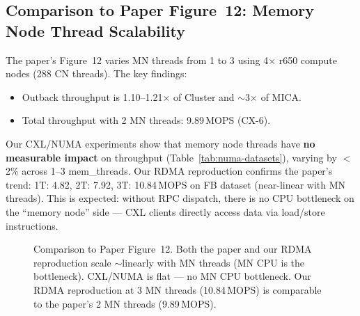\documentclass[11pt,a4paper]{article}
\begin{document}
\subsection{Comparison to Paper Figure~12: Memory Node Thread Scalability}

The paper's Figure~12 varies MN threads from 1 to 3 using 4$\times$ r650 compute nodes (288 CN threads). The key findings:
\begin{itemize}[nosep]
  \item Outback throughput is 1.10--1.21$\times$ of Cluster and $\sim$3$\times$ of MICA.
  \item Total throughput with 2 MN threads: 9.89\,MOPS (CX-6).
\end{itemize}

Our CXL/NUMA experiments show that memory node threads have \textbf{no measurable impact} on throughput (Table~\ref{tab:numa-datasets}), varying by $<$2\% across 1--3 mem\_threads. Our RDMA reproduction confirms the paper's trend: 1T: 4.82, 2T: 7.92, 3T: 10.84\,MOPS on FB dataset (near-linear with MN threads). This is expected: without RPC dispatch, there is no CPU bottleneck on the ``memory node'' side --- CXL clients directly access data via load/store instructions.

\begin{figure}[H]
\centering
{}
\caption{Comparison to Paper Figure~12. Both the paper and our RDMA reproduction scale $\sim$linearly with MN threads (MN CPU is the bottleneck). CXL/NUMA is flat --- no MN CPU bottleneck. Our RDMA reproduction at 3 MN threads (10.84\,MOPS) is comparable to the paper's 2 MN threads (9.89\,MOPS).}
\label{fig:paper-fig12-cmp}
\end{figure}
\end{document}
